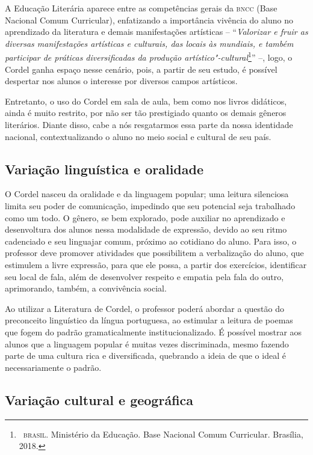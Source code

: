 \documentclass[12pt]{extarticle}
\begin{document}
{A Educação Literária aparece entre as competências gerais da \textsc{bncc} (Base
Nacional Comum Curricular), enfatizando a importância vivência do aluno
no aprendizado da literatura e demais manifestações artísticas --
``\emph{Valorizar e fruir as diversas manifestações artísticas e
culturais, das locais às mundiais, e também participar de práticas
diversificadas da produção artístico"-cultural}\footnote{~\textsc{brasil}.
  Ministério da Educação. Base Nacional Comum Curricular. Brasília,
  2018.}'' --, logo, o Cordel ganha espaço nesse cenário, pois, a
partir de seu estudo, é possível despertar nos alunos o interesse por
diversos campos artísticos.

Entretanto, o uso do Cordel em sala de aula, bem como nos livros
didáticos, ainda é muito restrito, por não ser tão prestigiado quanto os
demais gêneros literários. Diante disso, cabe a nós resgatarmos essa
parte da nossa identidade nacional, contextualizando o aluno no meio
social e cultural de seu país.

\subsection{Variação linguística e oralidade}

O Cordel nasceu da oralidade e da linguagem popular; uma leitura
silenciosa limita seu poder de comunicação, impedindo que seu potencial
seja trabalhado como um todo. O gênero, se bem explorado, pode auxiliar
no aprendizado e desenvoltura dos alunos nessa modalidade de expressão,
devido ao seu ritmo cadenciado e seu linguajar comum, próximo ao
cotidiano do aluno. Para isso, o professor deve promover atividades que
possibilitem a verbalização do aluno, que estimulem a livre expressão,
para que ele possa, a partir dos exercícios, identificar seu local de
fala, além de desenvolver respeito e empatia pela fala do outro,
aprimorando, também, a convivência social.

Ao utilizar a Literatura de Cordel, o professor poderá abordar a questão
do preconceito linguístico da língua portuguesa, ao estimular a leitura
de poemas que fogem do padrão gramaticalmente institucionalizado. É
possível mostrar aos alunos que a linguagem popular é muitas vezes
discriminada, mesmo fazendo parte de uma cultura rica e diversificada,
quebrando a ideia de que o ideal é necessariamente o padrão.

\subsection{Variação cultural e geográfica}

}
\end{document}
